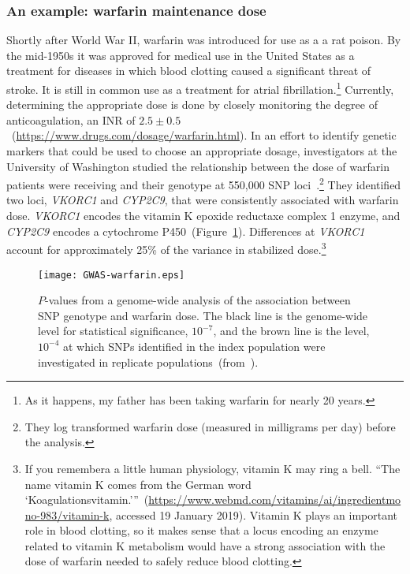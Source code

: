 \subsubsection*{An example: warfarin maintenance
  dose}

Shortly after World War II, warfarin was introduced for use as a a rat
poison. By the mid-1950s it was approved for medical use in the United
States as a treatment for diseases in which blood clotting caused a
significant threat of stroke. It is still in common use as a treatment
for atrial fibrillation.\footnote{As it happens, my father has been
  taking warfarin for nearly 20 years.} Currently, determining the
appropriate dose is done by closely monitoring the degree of
anticoagulation, an INR of
$2.5 \pm 0.5$~(\url{https://www.drugs.com/dosage/warfarin.html}). In
an effort to identify genetic markers that could be used to choose an
appropriate dosage, investigators at the University of Washington
studied the relationship between the dose of warfarin patients were
receiving and their genotype at 550,000 SNP
loci~\cite{Cooper-etal-2008}.\footnote{They log transformed warfarin
  dose (measured in milligrams per day) before the analysis.} They
identified two loci, {\it VKORC1} and {\it CYP2C9}, that were
consistently associated with warfarin dose. {\it VKORC1} encodes the
vitamin K epoxide reductaxe complex 1 enzyme, and {\it CYP2C9} encodes
a cytochrome P450~(Figure~\ref{fig:GWAS-warfarin}). Differences at
{\it VKORC1} account for approximately 25\% of the variance in
stabilized dose.\footnote{If you remembera a little human physiology,
  vitamin K may ring a bell. ``The name vitamin K comes from the
  German word
  `Koagulationsvitamin.'''~(\url{https://www.webmd.com/vitamins/ai/ingredientmono-983/vitamin-k},
  accessed 19 January 2019). Vitamin K plays an important role in
  blood clotting, so it makes sense that a locus encoding an enzyme
  related to vitamin K metabolism would have a strong association with
  the dose of warfarin needed to safely reduce blood clotting.}

\begin{figure}
\begin{center}
\texttt{[image: GWAS-warfarin.eps]}
\end{center}
  \caption{$P$-values from a genome-wide analysis of the association
    between SNP genotype and warfarin dose. The black line is the
    genome-wide level for statistical significance, $10^{-7}$, and the
    brown line is the level, $10^{-4}$ at which SNPs identified in the
    index population were investigated in replicate
    populations~(from~\cite{Cooper-etal-2008}).}\label{fig:GWAS-warfarin}
\end{figure}

